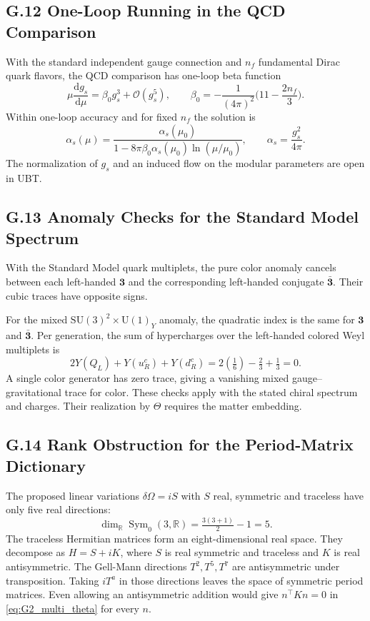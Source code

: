 \subsection*{G.12 One-Loop Running in the QCD Comparison}
\label{sec:G12_running}
With the standard independent gauge connection and $n_f$ fundamental Dirac
quark flavors, the QCD comparison has one-loop beta function
\begin{equation}
\label{eq:G12_beta}
\mu\frac{\mathrm d g_s}{\mathrm d\mu}=\beta_0 g_s^3+\mathcal O(g_s^5),
\qquad \beta_0=-\frac{1}{(4\pi)^2}\Big(11-\frac{2n_f}{3}\Big).
\end{equation}
Within one-loop accuracy and for fixed $n_f$ the solution is
\begin{equation}
\alpha_s(\mu)=\frac{\alpha_s(\mu_0)}
{1-8\pi\beta_0\alpha_s(\mu_0)\ln(\mu/\mu_0)},
\qquad \alpha_s=\frac{g_s^2}{4\pi}.
\end{equation}
The normalization of $g_s$ and an induced flow on the modular parameters
are open in UBT.

\subsection*{G.13 Anomaly Checks for the Standard Model Spectrum}
\label{sec:G13_anomalies}
With the Standard Model quark multiplets, the pure color anomaly cancels
between each left-handed $\mathbf 3$ and the corresponding left-handed
conjugate $\bar{\mathbf 3}$. Their cubic traces have opposite signs.

For the mixed $\mathrm{SU}(3)^2\times\mathrm{U}(1)_Y$ anomaly, the quadratic
index is the same for $\mathbf 3$ and $\bar{\mathbf 3}$. Per generation,
the sum of hypercharges over the left-handed colored Weyl multiplets is
\begin{equation}
2Y(Q_L)+Y(u_R^c)+Y(d_R^c)
=2\left(\tfrac16\right)-\tfrac23+\tfrac13=0.
\end{equation}
A single color generator has zero trace, giving a vanishing mixed
gauge--gravitational trace for color. These checks apply with the stated
chiral spectrum and charges. Their realization by $\Theta$ requires the
matter embedding.

\subsection*{G.14 Rank Obstruction for the Period-Matrix Dictionary}
\label{sec:G14_mapping}
The proposed linear variations $\delta\Omega=iS$ with $S$ real, symmetric
and traceless have only five real directions:
\begin{equation}
\dim_{\mathbb R}\operatorname{Sym}_0(3,\mathbb R)=\tfrac{3(3+1)}2-1=5.
\end{equation}
The traceless Hermitian matrices form an eight-dimensional real space.
They decompose as $H=S+iK$, where $S$ is real symmetric and traceless and
$K$ is real antisymmetric. The Gell-Mann directions $T^2,T^5,T^7$ are
antisymmetric under transposition. Taking $iT^a$ in those directions leaves
the space of symmetric period matrices. Even allowing an antisymmetric
addition would give $n^\top K n=0$ in \eqref{eq:G2_multi_theta} for every $n$.

